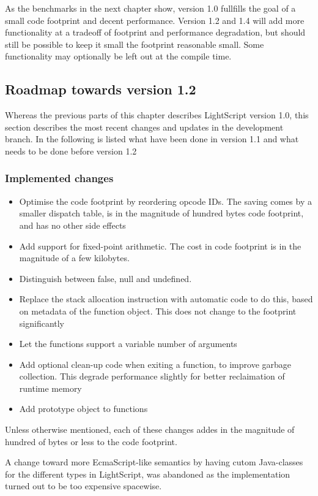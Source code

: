 \documentclass[11pt]{report}
\begin{document}
As the benchmarks in the next chapter show, version 1.0 fullfills the goal of a small code footprint and decent performance.
Version 1.2 and 1.4 will add more functionality at a tradeoff of footprint and performance degradation, but should still be possible to keep it small the footprint reasonable small. Some functionality may optionally be left out at the compile time.



\subsection{Roadmap towards version 1.2}
Whereas the previous parts of this chapter describes LightScript version 1.0, this section describes the most recent changes and updates in the development branch.
In the following is listed what have been done in version 1.1 and what needs to be done before version 1.2
\subsubsection{Implemented changes}
\begin{itemize}
\item Optimise the code footprint by reordering opcode IDs. The saving comes by a smaller dispatch table, is in the magnitude of hundred bytes code footprint, and has no other side effects
\item Add support for fixed-point arithmetic. The cost in code footprint is in the magnitude of a few kilobytes.
\item Distinguish between false, null and undefined.
\item Replace the stack allocation instruction with automatic code to do this, based on metadata of the function object. This does not change to the footprint significantly
\item Let the functions support a variable number of arguments
\item Add optional clean-up code when exiting a function, to improve garbage collection. This degrade performance slightly for better reclaimation of runtime memory
\item Add prototype object to functions
\end{itemize}
Unless otherwise mentioned, each of these changes addes in the magnitude of hundred of bytes or less to the code footprint.

A change toward more EcmaScript-like semantics by having cutom Java-classes for the different types in LightScript, was abandoned as the implementation turned out to be too expensive spacewise.
\end{document}
